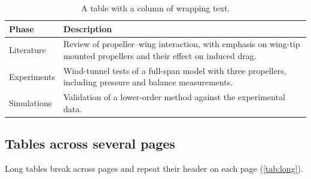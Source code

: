 \begin{table}[tbp]
    \centering
    \caption[A table with a column of wrapping text]{A table with a column of wrapping text.}
    \label{tab:wrapping}
    \begin{tabularx}{\textwidth}{@{}l X@{}}
        \toprule
        Phase       & Description \\
        \midrule
        Literature  & Review of propeller--wing interaction, with emphasis on wing-tip mounted propellers and their effect on induced drag. \\
        Experiments & Wind-tunnel tests of a full-span model with three propellers, including pressure and balance measurements. \\
        Simulations & Validation of a lower-order method against the experimental data. \\
        \bottomrule
    \end{tabularx}
\end{table}

\subsection{Tables across several pages}

Long tables break across pages and repeat their header on each page (\cref{tab:long}).

